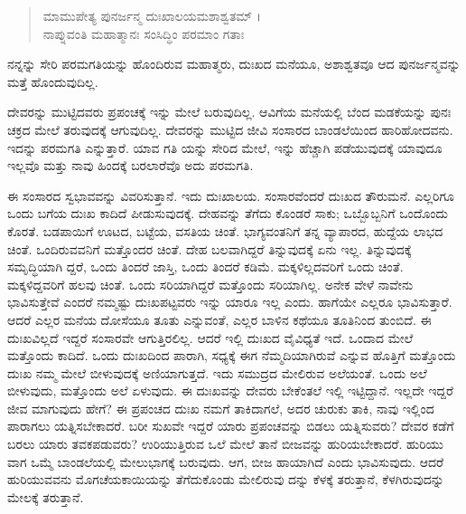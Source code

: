 \begin{verse}
ಮಾಮುಪೇತ್ಯ ಪುನರ್ಜನ್ಮ ದುಃಖಾಲಯಮಶಾಶ್ವತಮ್ ।\\ನಾಪ್ನುವಂತಿ ಮಹಾತ್ಮಾನಃ ಸಂಸಿದ್ಧಿಂ ಪರಮಾಂ ಗತಾಃ 
\end{verse}

{\small ನನ್ನನ್ನು ಸೇರಿ ಪರಮಗತಿಯನ್ನು ಹೊಂದಿರುವ ಮಹಾತ್ಮರು, ದುಃಖದ ಮನೆಯೂ, ಅಶಾಶ್ವತವೂ ಆದ ಪುನರ್ಜನ್ಮವನ್ನು ಮತ್ತೆ ಹೊಂದುವುದಿಲ್ಲ.}

ದೇವರನ್ನು ಮುಟ್ಟಿದವರು ಪ್ರಪಂಚಕ್ಕೆ ಇನ್ನು ಮೇಲೆ ಬರುವುದಿಲ್ಲ. ಆವಿಗೆಯ ಮನೆಯಲ್ಲಿ ಬೆಂದ ಮಡಕೆಯನ್ನು ಪುನಃ ಚಕ್ರದ ಮೇಲೆ ತರುವುದಕ್ಕೆ ಆಗುವುದಿಲ್ಲ. ದೇವರನ್ನು ಮುಟ್ಟಿದ ಜೀವಿ ಸಂಸಾರದ ಬಾಂಡಲೆಯಿಂದ ಹಾರಿಹೋದವನು. ಇದನ್ನು ಪರಮಗತಿ ಎನ್ನುತ್ತಾರೆ. ಯಾವ ಗತಿ ಯನ್ನು ಸೇರಿದ ಮೇಲೆ, ಇನ್ನು ಹೆಚ್ಚಾಗಿ ಪಡೆಯುವುದಕ್ಕೆ ಯಾವುದೂ ಇಲ್ಲವೊ ಮತ್ತು ನಾವು ಹಿಂದಕ್ಕೆ ಬರಲಾರೆವೊ ಅದು ಪರಮಗತಿ.

ಈ ಸಂಸಾರದ ಸ್ವಭಾವವನ್ನು ವಿವರಿಸುತ್ತಾನೆ. ಇದು ದುಃಖಾಲಯ. ಸಂಸಾರವೆಂದರೆ ದುಃಖದ ತೌರುಮನೆ. ಎಲ್ಲರಿಗೂ ಒಂದು ಬಗೆಯ ದುಃಖ ಕಾದಿದೆ ಪೀಡುಸುವುದಕ್ಕೆ. ದೇಹವನ್ನು ತೆಗೆದು ಕೊಂಡರೆ ಸಾಕು; ಒಬ್ಬೊಬ್ಬನಿಗೆ ಒಂದೊಂದು ಕೊರತೆ. ಬಡಪಾಯಿಗೆ ಊಟದ, ಬಟ್ಟೆಯ, ವಸತಿಯ ಚಿಂತೆ. ಭಾಗ್ಯವಂತನಿಗೆ ತನ್ನ ವ್ಯಾಪಾರದ, ಹುದ್ದೆಯ ಲಾಭದ ಚಿಂತೆ. ಒಂದಿರುವವನಿಗೆ ಮತ್ತೊಂದರ ಚಿಂತೆ. ದೇಹ ಬಲವಾಗಿದ್ದರೆ ತಿನ್ನುವುದಕ್ಕೆ ಏನು ಇಲ್ಲ. ತಿನ್ನುವುದಕ್ಕೆ ಸಮೃದ್ಧಿಯಾಗಿ ದ್ದರೆ, ಒಂದು ತಿಂದರೆ ಜಾಸ್ತಿ, ಒಂದು ತಿಂದರೆ ಕಡಿಮೆ. ಮಕ್ಕಳಿಲ್ಲದವರಿಗೆ ಒಂದು ಚಿಂತೆ. ಮಕ್ಕಳಿದ್ದವರಿಗೆ ಹಲವು ಚಿಂತೆ. ಒಂದು ಸರಿಯಾಗಿದ್ದರೆ ಮತ್ತೊಂದು ಸರಿಯಾಗಿಲ್ಲ. ಅನೇಕ ವೇಳೆ ನಾವೇನು ಭಾವಿಸುತ್ತೇವೆ ಎಂದರೆ ನಮ್ಮಷ್ಟು ದುಃಖಪಟ್ಟವರು ಇನ್ನು ಯಾರೂ ಇಲ್ಲ ಎಂದು. ಹಾಗೆಯೇ ಎಲ್ಲರೂ ಭಾವಿಸುತ್ತಾರೆ. ಆದರೆ ಎಲ್ಲರ ಮನೆಯ ದೋಸೆಯೂ ತೂತು ಎನ್ನುವಂತೆ, ಎಲ್ಲರ ಬಾಳಿನ ಕಥೆಯೂ ತೂತಿನಿಂದ ತುಂಬಿದೆ. ಈ ದುಃಖವಿಲ್ಲದೆ ಇದ್ದರೆ ಸಂಸಾರವೇ ಆಗುತ್ತಿರಲಿಲ್ಲ. ಆದರೆ ಇಲ್ಲಿ ದುಃಖದ ವೈವಿಧ್ಯತೆ ಇದೆ. ಒಂದಾದ ಮೇಲೆ ಮತ್ತೊಂದು ಕಾದಿದೆ. ಒಂದು ದುಃಖದಿಂದ ಪಾರಾಗಿ, ಸಧ್ಯಕ್ಕೆ ಈಗ ನೆಮ್ಮದಿಯಾಗಿರುವೆ ಎನ್ನುವ ಹೊತ್ತಿಗೆ ಮತ್ತೊಂದು ದುಃಖ ನಮ್ಮ ಮೇಲೆ ಬೀಳುವುದಕ್ಕೆ ಅಣಿಯಾಗುತ್ತದೆ. ಇದು ಸಮುದ್ರದ ಮೇಲಿರುವ ಅಲೆಯಂತೆ. ಒಂದು ಅಲೆ ಬೀಳುವುದು, ಮತ್ತೊಂದು ಅಲೆ ಏಳುವುದು. ಈ ದುಃಖವನ್ನು ದೇವರು ಬೇಕೆಂತಲೆ ಇಲ್ಲಿ ಇಟ್ಟಿದ್ದಾನೆ. ಇಲ್ಲದೇ ಇದ್ದರೆ ಜೀವ ಮಾಗುವುದು ಹೇಗೆ? ಈ ಪ್ರಪಂಚದ ದುಃಖ ನಮಗೆ ತಾಕಿದಾಗಲೆ, ಅದರ ಚುರುಕು ತಾಕಿ, ನಾವು ಇಲ್ಲಿಂದ ಪಾರಾಗಲು ಯತ್ನಿಸಬೇಕಾದರೆ. ಬರೀ ಸುಖವೇ ಇದ್ದರೆ ಯಾರು ಪ್ರಪಂಚವನ್ನು ಬಿಡಲು ಯತ್ನಿಸುವರು? ದೇವರ ಕಡೆಗೆ ಬರಲು ಯಾರು ತವಕಪಡುವರು? ಉರಿಯುತ್ತಿರುವ ಒಲೆ ಮೇಲೆ ತಾನೆ ಬೀಜವನ್ನು ಹುರಿಯಬೇಕಾದರೆ. ಹುರಿಯು ವಾಗ ಒಮ್ಮೆ ಬಾಂಡಲೆಯಲ್ಲಿ ಮೇಲುಭಾಗಕ್ಕೆ ಬರುವುದು. ಆಗ, ಬೀಜ ಹಾಯಾಗಿದೆ ಎಂದು ಭಾವಿಸುವುದು. ಆದರೆ ಹುರಿಯುವವನು ಮೊಗಚೆಯಕಾಯಿಯನ್ನು ತೆಗೆದುಕೊಂಡು ಮೇಲಿರುವು ದನ್ನು ಕೆಳಕ್ಕೆ ತರುತ್ತಾನೆ, ಕೆಳಗಿರುವುದನ್ನು ಮೇಲಕ್ಕೆ ತರುತ್ತಾನೆ.

